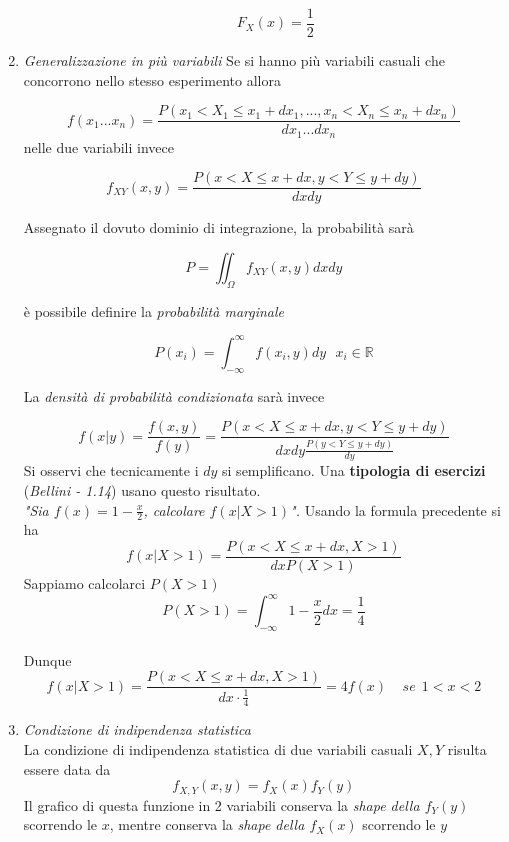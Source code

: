 \documentclass[]{article}
\newcommand{\numberset}{\mathbb}
\newcommand{\R}{\numberset{R}}
\begin{document}
\begin{enumerate}
\begin{enumerate}
\begin{equation}
F_X(x)=\frac{1}{2}
\end{equation}

\end{enumerate}

\item \textit{Generalizzazione in più variabili}
Se si hanno più variabili casuali che concorrono nello stesso esperimento allora

\begin{equation}
f(x_1...x_n)=\frac{P(x_1<X_1\leq x_1+dx_1,...,x_n<X_n\leq x_n+dx_n)}{dx_1 ... dx_n}
\end{equation}
nelle due variabili invece

\begin{equation}
f_{XY}(x,y)=\frac{P(x<X\leq x+dx,y<Y\leq y+dy)}{dx dy}
\end{equation}

Assegnato il dovuto dominio di integrazione, la probabilità sarà

\begin{equation}
P= \iint_{\Omega} f_{XY}(x,y) dx dy
\end{equation}

è possibile definire la \textit{probabilità marginale}

\begin{equation}
P(x_i)= \int_{-\infty}^{\infty} f(x_i,y)dy \ \ \ x_i \in \R
\end{equation}

La \textit{densità di probabilità condizionata} sarà invece

\begin{equation}
f(x|y)=\frac{f(x,y)}{f(y)}=\frac{P(x<X\leq x+dx,y<Y\leq y+dy)}{dx dy \frac{P(y<Y\leq y+dy)}{dy}}
\end{equation}
Si osservi che tecnicamente i $dy$ si semplificano. Una \textbf{tipologia di esercizi} (\textit{Bellini - 1.14}) usano questo risultato.
\\
\textit{"Sia $f(x)=1-\frac{x}{2}$, calcolare $f(x|X> 1)$".}
Usando la formula precedente si ha
\[
f(x|X>1)=\frac{P(x<X\leq x+dx,X>1)}{dx P(X>1)}
\]
Sappiamo calcolarci $P(X>1)$
\[
P(X>1)=\int_{-\infty}^{\infty} 1- \frac{x}{2}dx=\frac{1}{4}
\]
\\
Dunque
\[
f(x|X>1)=\frac{P(x<X\leq x+dx,X>1)}{dx \cdot \frac{1}{4}}= 4f(x) \ \ \ \ \ se \ \ 1<x<2
\]


\item \textit{Condizione di indipendenza statistica}
\\
La condizione di indipendenza statistica di due variabili casuali $X,Y$ risulta essere data da
 \begin{equation}
 f_{X,Y}(x,y)=f_X(x)f_Y(y)
 \end{equation}
 Il grafico di questa funzione in 2 variabili conserva la \textit{shape della $f_Y(y)$} scorrendo le $x$, mentre conserva la \textit{shape della $f_X(x)$} scorrendo le $y$
\end{enumerate}
\end{document}
